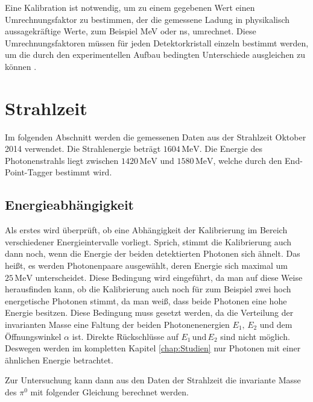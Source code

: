 \documentclass[a4paper,11pt,oneside,final,german,openbib,pdftex]{scrbook}
\begin{document}
{Eine Kalibration ist notwendig, um zu einem gegebenen Wert einen Umrechnungsfaktor zu bestimmen, der die gemessene Ladung in physikalisch aussagekr\"aftige Werte, zum Beispiel MeV oder ns, umrechnet. Diese Umrechnungsfaktoren m\"ussen f\"ur jeden Detektorkristall einzeln bestimmt werden, um die durch den experimentellen Aufbau bedingten Unterschiede ausgleichen zu können \cite{Un08}.



\section{Strahlzeit}
\label{sec:Reelle-Daten}

Im folgenden Abschnitt werden die gemessenen Daten aus der Strahlzeit Oktober 2014 verwendet. Die Strahlenergie betr\"agt $1604 \,\text{MeV}$. Die Energie des Photonenstrahls liegt zwischen $1420\,\text{MeV}$ und $1580\,\text{MeV}$, welche durch den End-Point-Tagger bestimmt wird. 

\subsection{Energieabhängigkeit}
\label{sec:Energie-Interval-Abhaengigkeit}

Als erstes wird überprüft, ob eine Abhängigkeit der Kalibrierung im Bereich verschiedener Energieintervalle vorliegt. Sprich, stimmt die Kalibrierung auch dann noch, wenn die Energie der beiden detektierten Photonen sich ähnelt. Das hei{\ss}t, es werden Photonenpaare ausgew\"ahlt, deren Energie sich maximal um $25 \,\text{MeV}$ unterscheidet. Diese Bedingung wird eingef\"uhrt, da man auf diese Weise herausfinden kann, ob die Kalibrierung auch noch f\"ur zum Beispiel zwei hoch energetische Photonen stimmt, da man wei{\ss}, dass beide Photonen eine hohe Energie besitzen. %
Diese Bedingung muss gesetzt werden, da die Verteilung der invarianten Masse eine Faltung der beiden Photonenenergien $E_1,\,E_2$ und dem \"Offnungswinkel $\alpha$ ist. Direkte R\"uckschl\"usse auf $E_1\, \text{und} \, E_2$ sind nicht m\"oglich. 
Deswegen werden im kompletten Kapitel \ref{chap:Studien} nur Photonen mit einer \"ahnlichen Energie betrachtet.

Zur Untersuchung kann dann aus den Daten der Strahlzeit die invariante Masse des $\pi^0$ mit folgender Gleichung berechnet werden.

}
\end{document}
